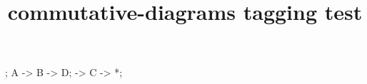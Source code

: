 \documentclass{article}
\title{commutative-diagrams tagging test}
\begin{document}
\begin{codi}
;
\mor A -> B -> D;
\mor * -> C -> *;
\end{codi}
\end{document}
